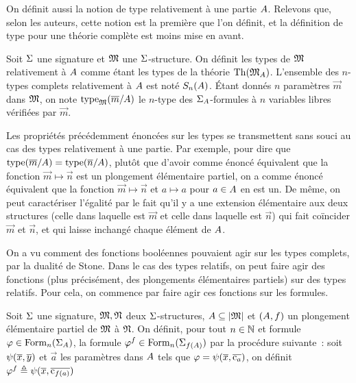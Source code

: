On définit aussi la notion de type relativement à une partie $A$. Relevons
que, selon les auteurs, cette notion est la première que l'on définit, et la
définition de type pour une théorie complète est moins mise en avant.

\begin{definition}
  Soit $\Sigma$ une signature et $\mathfrak{M}$ une $\Sigma$-structure. On définit les
  types de $\mathfrak{M}$ relativement à $A$ comme étant les types de la théorie
  $\operatorname{Th}(\mathfrak{M}_{A})$. L'ensemble des $n$-types complets relativement à
  $A$ est noté $S_{n}(A)$. \'Etant donnés $n$ paramètres $\vec m$
  dans $\mathfrak{M}$, on note $\operatorname{type}_{\mathfrak{M}}(\overline{m}/A)$ le $n$-type
  des $\Sigma_{A}$-formules à $n$ variables libres vérifiées par $\vec m$.
\end{definition}

Les propriétés précédemment énoncées sur les types se transmettent sans souci au
cas des types relativement à une partie.
Par exemple, pour dire que $\operatorname{type}(\overline{m}/A) = \operatorname{type}(\overline{n}/A)$, plutôt
que d'avoir comme énoncé équivalent que la fonction $\vec m \mapsto \vec n$ est
un plongement élémentaire partiel, on a comme énoncé équivalent que la fonction
$\vec m \mapsto \vec n$ et $a\mapsto a$ pour $a \in A$ en est un. De même,
on peut caractériser l'égalité par le fait qu'il y a une extension élémentaire
aux deux structures (celle dans laquelle est $\vec m$ et celle dans laquelle
est $\vec n$) qui fait coïncider $\vec m$ et $\vec n$, et qui laisse
inchangé chaque élément de $A$.

On a vu comment des fonctions booléennes pouvaient agir sur les types complets,
par la dualité de Stone. Dans le cas des types relatifs, on peut faire agir des
fonctions (plus précisément, des plongements élémentaires partiels) sur des
types relatifs. Pour cela, on commence par faire agir ces fonctions sur les
formules.

\begin{definition}
  Soit $\Sigma$ une signature, $\mathfrak{M},\mathfrak{N}$ deux $\Sigma$-structures,
  $A\subseteq\left\vert \mathfrak{M}\right\vert$ et $(A,f)$ un plongement élémentaire
  partiel de $\mathfrak{M}$ à $\mathfrak{N}$. On définit, pour tout $n\in\mathbb N$ et formule
  $\varphi\in\operatorname{Form}_n(\Sigma_{A})$, la formule
  $\varphi^{f}\in\operatorname{Form}_n(\Sigma_{f(A)})$ par la
  procédure suivante~: soit $\psi(\overline{x},\overline{y})$ et $\vec a$ les paramètres
  dans $A$ tels que $\varphi = \psi(\overline{x},\overline{\mathrm{c}_a})$, on définit
  $\varphi^{f} \triangleq \psi(\overline{x},\overline{\mathrm{c}_{f(a)}})$
\end{definition}

